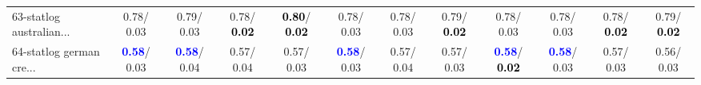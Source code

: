 \begin{table}[h]
\begin{center}
{\begin{tabular}{lc|c|c|c|c|c|c|c|c|c|c}
63-statlog australian... &   0.78/  0.03 &   0.79/  0.03 &   0.78/\textcolor{black}{\textbf{  0.02}} & \textcolor{black}{\textbf{  0.80}}/\textcolor{black}{\textbf{  0.02}} &   0.78/  0.03 &   0.78/  0.03 &   0.79/\textcolor{black}{\textbf{  0.02}} &   0.78/  0.03 &   0.78/  0.03 &   0.78/\textcolor{black}{\textbf{  0.02}} &   0.79/\textcolor{black}{\textbf{  0.02}} \\
64-statlog german cre... & \textcolor{blue}{\textbf{  0.58}}/  0.03 & \textcolor{blue}{\textbf{  0.58}}/  0.04 &   0.57/  0.04 &   0.57/  0.03 & \textcolor{blue}{\textbf{  0.58}}/  0.03 &   0.57/  0.04 &   0.57/  0.03 & \textcolor{blue}{\textbf{  0.58}}/\textcolor{black}{\textbf{  0.02}} & \textcolor{blue}{\textbf{  0.58}}/  0.03 &   0.57/  0.03 &   0.56/  0.03 \\\end{tabular}
}\label{strats1a5NN}
\end{center}
\end{table}
